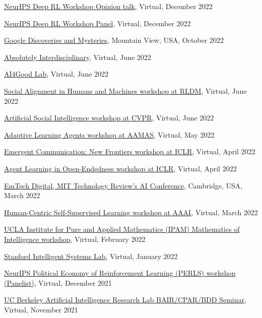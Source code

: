 \documentclass[paper=letter,fontsize=11pt]{scrartcl} %
\newcommand{\TalkEntry}[4]{
		\noindent \href{#4}{#1}, #2, #3 }
\begin{document}
\begin{etaremune}
\item\TalkEntry{NeurIPS Deep RL Workshop Opinion talk}{Virtual}{December 2022}{https://neurips.cc/virtual/2022/63884}
\item\TalkEntry{NeurIPS Deep RL Workshop Panel}{Virtual}{December 2022}{https://neurips.cc/virtual/2022/66219}
\item\TalkEntry{Google Discoveries and Mysteries}{Mountain View, USA}{October 2022}{}
\item\TalkEntry{Absolutely Interdisciplinary}{Virtual}{June 2022}{https://absolutelyinterdisciplinary.com/speakers-2022}
\item\TalkEntry{AI4Good Lab}{Virtual}{June 2022}{https://www.ai4goodlab.com/}
\item\TalkEntry{Social Alignment in Humans and Machines workshop at RLDM}{Virtual}{June 2022}{https://sites.google.com/corp/mila.quebec/soc-rldm/home}
\item\TalkEntry{Artificial Social Intelligence workshop at CVPR}{Virtual}{June 2022}{https://sites.google.com/corp/berkeley.edu/artificial-social-intelligence}
\item\TalkEntry{Adaptive Learning Agents workshop at AAMAS}{Virtual}{May 2022}{https://youtu.be/0fyCDafLrfU?t=5301}
\item\TalkEntry{Emergent Communication: New Frontiers workshop at ICLR}{Virtual}{April 2022}{https://sites.google.com/corp/view/emecom2022}
\item\TalkEntry{Agent Learning in Open-Endedness workshop at ICLR}{Virtual}{April 2022}{https://sites.google.com/corp/view/aloe2022/schedule}
\item\TalkEntry{EmTech Digital, MIT Technology Review's AI Conference}{Cambridge, USA}{March 2022}{https://event.technologyreview.com/emtech-digital-2022/speakers}
\item\TalkEntry{Human-Centric Self-Supervised Learning workshop at AAAI}{Virtual}{March 2022}{https://hcssl.github.io/AAAI-22/pages/speakers.html}
\item\TalkEntry{UCLA Institute for Pure and Applied Mathematics (IPAM) Mathematics of Intelligence workshop}{Virtual}{February 2022}{https://www.youtube.com/watch?v=rjLT0NkCp9I}
\item\TalkEntry{Stanford Intelligent Systems Lab}{Virtual}{January 2022}{}
\item\TalkEntry{NeurIPS Political Economy of Reinforcement Learning (PERLS) workshop (Panelist)}{Virtual}{December 2021}{https://neurips.cc/virtual/2021/workshop/21864}
\item\TalkEntry{UC Berkeley Artificial Intelligence Research Lab BAIR/CPAR/BDD Seminar}{Virtual}{November 2021}{}

\end{etaremune}
\end{document}
